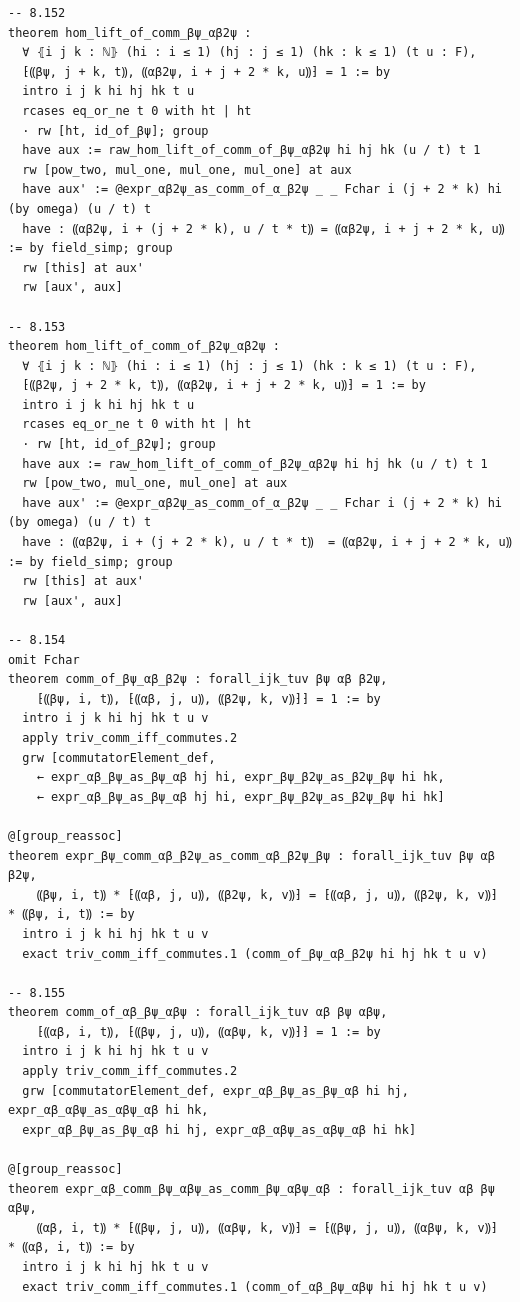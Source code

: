 \documentclass[10pt,a4paper]{article}
\begin{document}
\begin{Verbatim}
-- 8.152
theorem hom_lift_of_comm_βψ_αβ2ψ :
  ∀ ⦃i j k : ℕ⦄ (hi : i ≤ 1) (hj : j ≤ 1) (hk : k ≤ 1) (t u : F),
  ⁅⸨βψ, j + k, t⸩, ⸨αβ2ψ, i + j + 2 * k, u⸩⁆ = 1 := by
  intro i j k hi hj hk t u
  rcases eq_or_ne t 0 with ht | ht
  · rw [ht, id_of_βψ]; group
  have aux := raw_hom_lift_of_comm_of_βψ_αβ2ψ hi hj hk (u / t) t 1
  rw [pow_two, mul_one, mul_one, mul_one] at aux
  have aux' := @expr_αβ2ψ_as_comm_of_α_β2ψ _ _ Fchar i (j + 2 * k) hi (by omega) (u / t) t
  have : ⸨αβ2ψ, i + (j + 2 * k), u / t * t⸩ = ⸨αβ2ψ, i + j + 2 * k, u⸩ := by field_simp; group
  rw [this] at aux'
  rw [aux', aux]

-- 8.153
theorem hom_lift_of_comm_of_β2ψ_αβ2ψ :
  ∀ ⦃i j k : ℕ⦄ (hi : i ≤ 1) (hj : j ≤ 1) (hk : k ≤ 1) (t u : F),
  ⁅⸨β2ψ, j + 2 * k, t⸩, ⸨αβ2ψ, i + j + 2 * k, u⸩⁆ = 1 := by
  intro i j k hi hj hk t u
  rcases eq_or_ne t 0 with ht | ht
  · rw [ht, id_of_β2ψ]; group
  have aux := raw_hom_lift_of_comm_of_β2ψ_αβ2ψ hi hj hk (u / t) t 1
  rw [pow_two, mul_one, mul_one] at aux
  have aux' := @expr_αβ2ψ_as_comm_of_α_β2ψ _ _ Fchar i (j + 2 * k) hi (by omega) (u / t) t
  have : ⸨αβ2ψ, i + (j + 2 * k), u / t * t⸩  = ⸨αβ2ψ, i + j + 2 * k, u⸩ := by field_simp; group
  rw [this] at aux'
  rw [aux', aux]

-- 8.154
omit Fchar
theorem comm_of_βψ_αβ_β2ψ : forall_ijk_tuv βψ αβ β2ψ,
    ⁅⸨βψ, i, t⸩, ⁅⸨αβ, j, u⸩, ⸨β2ψ, k, v⸩⁆⁆ = 1 := by
  intro i j k hi hj hk t u v
  apply triv_comm_iff_commutes.2
  grw [commutatorElement_def,
    ← expr_αβ_βψ_as_βψ_αβ hj hi, expr_βψ_β2ψ_as_β2ψ_βψ hi hk,
    ← expr_αβ_βψ_as_βψ_αβ hj hi, expr_βψ_β2ψ_as_β2ψ_βψ hi hk]

@[group_reassoc]
theorem expr_βψ_comm_αβ_β2ψ_as_comm_αβ_β2ψ_βψ : forall_ijk_tuv βψ αβ β2ψ,
    ⸨βψ, i, t⸩ * ⁅⸨αβ, j, u⸩, ⸨β2ψ, k, v⸩⁆ = ⁅⸨αβ, j, u⸩, ⸨β2ψ, k, v⸩⁆ * ⸨βψ, i, t⸩ := by
  intro i j k hi hj hk t u v
  exact triv_comm_iff_commutes.1 (comm_of_βψ_αβ_β2ψ hi hj hk t u v)

-- 8.155
theorem comm_of_αβ_βψ_αβψ : forall_ijk_tuv αβ βψ αβψ,
    ⁅⸨αβ, i, t⸩, ⁅⸨βψ, j, u⸩, ⸨αβψ, k, v⸩⁆⁆ = 1 := by
  intro i j k hi hj hk t u v
  apply triv_comm_iff_commutes.2
  grw [commutatorElement_def, expr_αβ_βψ_as_βψ_αβ hi hj, expr_αβ_αβψ_as_αβψ_αβ hi hk,
  expr_αβ_βψ_as_βψ_αβ hi hj, expr_αβ_αβψ_as_αβψ_αβ hi hk]

@[group_reassoc]
theorem expr_αβ_comm_βψ_αβψ_as_comm_βψ_αβψ_αβ : forall_ijk_tuv αβ βψ αβψ,
    ⸨αβ, i, t⸩ * ⁅⸨βψ, j, u⸩, ⸨αβψ, k, v⸩⁆ = ⁅⸨βψ, j, u⸩, ⸨αβψ, k, v⸩⁆ * ⸨αβ, i, t⸩ := by
  intro i j k hi hj hk t u v
  exact triv_comm_iff_commutes.1 (comm_of_αβ_βψ_αβψ hi hj hk t u v)


\end{Verbatim}
\end{document}
